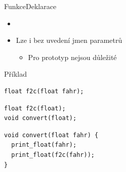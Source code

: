 \begin{frame}[fragile]{Funkce}{Deklarace}

  \begin{itemize}
    \item {}


    \item Lze i bez uvedení jmen parametrů
    \begin{itemize}
      \item Pro prototyp nejsou důležité
    \end{itemize}
  \end{itemize}


\begin{block}{Příklad}
\begin{lstlisting}[belowskip=0pt]
float f2c(float fahr);
\end{lstlisting}
\begin{lstlisting}[aboveskip=0pt]
float f2c(float);
void convert(float);
\end{lstlisting}
\begin{lstlisting}
void convert(float fahr) {
  print_float(fahr);
  print_float(f2c(fahr));
}
\end{lstlisting}
\end{block}

\end{frame}

